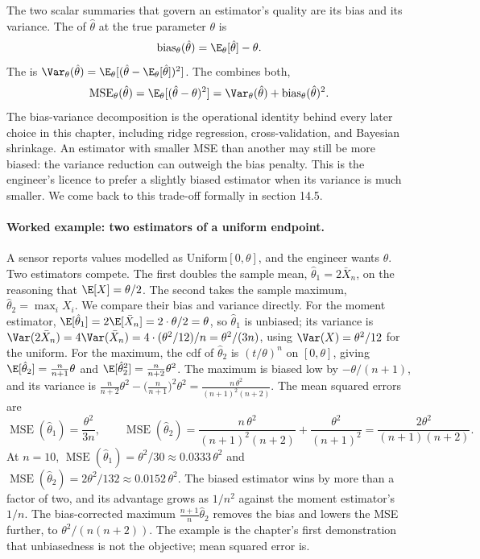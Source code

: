 The two scalar summaries that govern an estimator's quality are its
bias and its variance. The  of $\hat{\theta}$ at the
true parameter $\theta$ is
\[
\operatorname{bias}_{\theta}(\hat{\theta}) = \E_{\theta}[\hat{\theta}] - \theta.
\]
The  is $\Var_{\theta}(\hat{\theta}) =
\E_{\theta}[(\hat{\theta} - \E_{\theta}[\hat{\theta}])^{2}]$.
The  combines both,
\[
\operatorname{MSE}_{\theta}(\hat{\theta})
= \E_{\theta}[(\hat{\theta} - \theta)^{2}]
= \Var_{\theta}(\hat{\theta}) + \operatorname{bias}_{\theta}(\hat{\theta})^{2}.
\]
The bias-variance decomposition is the operational identity behind
every later choice in this chapter, including ridge regression,
cross-validation, and Bayesian shrinkage. An estimator with smaller
MSE than another may still be more biased: the variance reduction
can outweigh the bias penalty. This is the engineer's licence to
prefer a slightly biased estimator when its variance is much
smaller. We come back to this trade-off formally in section 14.5.

\paragraph{Worked example: two estimators of a uniform endpoint.}
A sensor reports values modelled as $\mathrm{Uniform}[0, \theta]$,
and the engineer wants $\theta$. Two estimators compete. The
first doubles the sample mean, $\hat{\theta}_{1} = 2\bar{X}_{n}$,
on the reasoning that $\E[X] = \theta/2$. The second takes the
sample maximum, $\hat{\theta}_{2} = \max_{i} X_{i}$. We compare
their bias and variance directly. For the moment estimator,
$\E[\hat{\theta}_{1}] = 2\E[\bar{X}_{n}] = 2 \cdot \theta/2 =
\theta$, so $\hat{\theta}_{1}$ is unbiased; its variance is
$\Var(2\bar{X}_{n}) = 4\Var(\bar{X}_{n}) = 4 \cdot
(\theta^{2}/12)/n = \theta^{2}/(3n)$, using
$\Var(X) = \theta^{2}/12$ for the uniform. For the maximum, the
cdf of $\hat{\theta}_{2}$ is $(t/\theta)^{n}$ on $[0, \theta]$,
giving $\E[\hat{\theta}_{2}] = \frac{n}{n+1}\theta$ and
$\E[\hat{\theta}_{2}^{2}] = \frac{n}{n+2}\theta^{2}$. The maximum
is biased low by $-\theta/(n+1)$, and its variance is
$\frac{n}{n+2}\theta^{2} - \bigl(\frac{n}{n+1}\bigr)^{2}\theta^{2}
= \frac{n\,\theta^{2}}{(n+1)^{2}(n+2)}$. The mean squared errors
are
\[
\operatorname{MSE}(\hat{\theta}_{1}) = \frac{\theta^{2}}{3n},
\qquad
\operatorname{MSE}(\hat{\theta}_{2})
= \frac{n\,\theta^{2}}{(n+1)^{2}(n+2)} + \frac{\theta^{2}}{(n+1)^{2}}
= \frac{2\theta^{2}}{(n+1)(n+2)}.
\]
At $n = 10$, $\operatorname{MSE}(\hat{\theta}_{1}) = \theta^{2}/30
\approx 0.0333\,\theta^{2}$ and $\operatorname{MSE}(\hat{\theta}_{2})
= 2\theta^{2}/132 \approx 0.0152\,\theta^{2}$. The biased estimator
wins by more than a factor of two, and its advantage grows as
$1/n^{2}$ against the moment estimator's $1/n$. The bias-corrected
maximum $\frac{n+1}{n}\hat{\theta}_{2}$ removes the bias and lowers
the MSE further, to $\theta^{2}/(n(n+2))$. The example is the
chapter's first demonstration that unbiasedness is not the
objective; mean squared error is.

